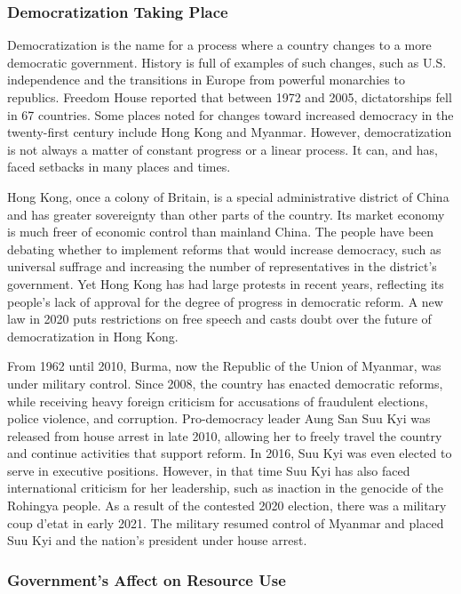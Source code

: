 \subsubsection{Democratization Taking Place}

Democratization is the name for a process where a country changes to a more
democratic government. History is full of examples of such changes, such as U.S.
independence and the transitions in Europe from powerful monarchies to
republics. Freedom House reported that between 1972 and 2005, dictatorships fell
in 67 countries. Some places noted for changes toward increased democracy in the
twenty-first century include Hong Kong and Myanmar. However, democratization is
not always a matter of constant progress or a linear process. It can, and has,
faced setbacks in many places and times.

Hong Kong, once a colony of Britain, is a special administrative district of
China and has greater sovereignty than other parts of the country. Its market
economy is much freer of economic control than mainland China. The people have
been debating whether to implement reforms that would increase democracy, such
as universal suffrage and increasing the number of representatives in the
district's government. Yet Hong Kong has had large protests in recent years,
reflecting its people’s lack of approval for the degree of progress in
democratic reform. A new law in 2020 puts restrictions on free speech and casts
doubt over the future of democratization in Hong Kong.

From 1962 until 2010, Burma, now the Republic of the Union of Myanmar, was under
military control. Since 2008, the country has enacted democratic reforms, while
receiving heavy foreign criticism for accusations of fraudulent elections,
police violence, and corruption. Pro-democracy leader Aung San Suu Kyi was
released from house arrest in late 2010, allowing her to freely travel the
country and continue activities that support reform. In 2016, Suu Kyi was even
elected to serve in executive positions. However, in that time Suu Kyi has also
faced international criticism for her leadership, such as inaction in the
genocide of the Rohingya people. As a result of the contested 2020 election,
there was a military coup d’etat in early 2021. The military resumed control of
Myanmar and placed Suu Kyi and the nation’s president under house arrest.

\subsubsection{Government's Affect on Resource Use}

